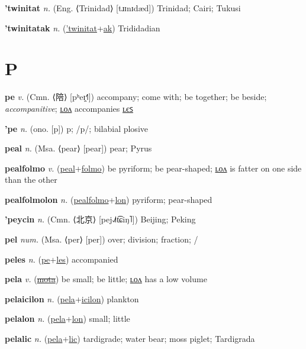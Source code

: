 \textbf{\hypertarget{'twinitat}{'twinitat}} \textit{n.} (Eng. ⟨Trinidad⟩ [tɹɪnɪdæd])
Trinidad; Cairi; Tukusi

\textbf{\hypertarget{'twinitatak}{'twinitatak}} \textit{n.} (\hyperlink{'twinitat}{'twinitat}+\allowbreak \hyperlink{ak}{ak})
Trididadian

\section{P}

\textbf{\hypertarget{pe}{pe}} \textit{v.} (Cmn. ⟨{\chinese{}陪}⟩ [pʰeɪ̯˧˥])
accompany; come with; be together; be beside; \textit{accompanitive}; \hyperlink{pelon}{ʟᴏᴧ} accompanies \hyperlink{peles}{ʟєꜱ}

\textbf{\hypertarget{'pe}{'pe}} \textit{n.} (ono. [p])
p; /p/; bilabial plosive

\textbf{\hypertarget{peal}{peal}} \textit{n.} (Msa. ⟨pear⟩ [pear])
pear; Pyrus

\textbf{\hypertarget{pealfolmo}{pealfolmo}} \textit{v.} (\hyperlink{peal}{peal}+\allowbreak \hyperlink{folmo}{folmo})
be pyriform; be pear-shaped; \hyperlink{pealfolmolon}{ʟᴏᴧ} is fatter on one side than the other

\textbf{\hypertarget{pealfolmolon}{pealfolmolon}} \textit{n.} (\hyperlink{pealfolmo}{pealfolmo}+\allowbreak \hyperlink{lon}{lon})
pyriform; pear-shaped

\textbf{\hypertarget{'peycin}{'peycin}} \textit{n.} (Cmn. ⟨{\chinese{}北京}⟩ [pej˨˩˦t͡ɕiŋ˥])
Beijing; Peking

\textbf{\hypertarget{pel}{pel}} \textit{num.} (Msa. ⟨per⟩ [per])
over; division; fraction; /

\textbf{\hypertarget{peles}{peles}} \textit{n.} (\hyperlink{pe}{pe}+\allowbreak \hyperlink{les}{les})
accompanied

\textbf{\hypertarget{pela}{pela}} \textit{v.} (\hyperlink{mota}{\sout{mota}})
be small; be little; \hyperlink{pelalon}{ʟᴏᴧ} has a low volume

\textbf{\hypertarget{pelaicilon}{pelaicilon}} \textit{n.} (\hyperlink{pela}{pela}+\allowbreak \hyperlink{icilon}{icilon})
plankton

\textbf{\hypertarget{pelalon}{pelalon}} \textit{n.} (\hyperlink{pela}{pela}+\allowbreak \hyperlink{lon}{lon})
small; little

\textbf{\hypertarget{pelalic}{pelalic}} \textit{n.} (\hyperlink{pela}{pela}+\allowbreak \hyperlink{lic}{lic})
tardigrade; water bear; moss piglet; Tardigrada

